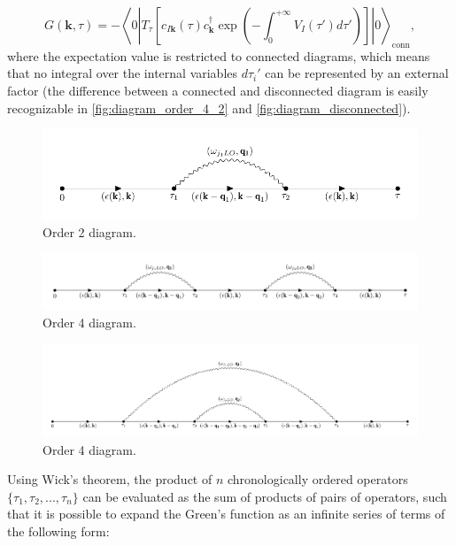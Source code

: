 \begin{equation}
    G(\mathbf{k},\tau)=-\left\langle 0 \left| T_\tau\left[c_{I\mathbf{k}}(\tau)c^\dagger_\mathbf{k}\exp{\left(-\int_0^{+\infty}V_I(\tau')d\tau'\right)}\right]\right|0\right\rangle_{\text{conn}},
\end{equation}
where the expectation value is restricted to connected diagrams, which means that no integral over the internal variables $d\tau_i'$ can be represented 
by an external factor (the difference between a connected and disconnected diagram is easily recognizable in \ref{fig:diagram_order_4_2} and 
\ref{fig:diagram_disconnected}).
\begin{figure}[H]
    \centering
    \includegraphics[scale=0.745]{diagram_order_2.pdf}
    \caption{Order 2 diagram.}
    \label{fig:diagram_order_2}
\end{figure}
\begin{figure}[H]
    \centering
    \includegraphics[scale=0.738]{diagram_order_4_1.pdf}
    \caption{Order 4 diagram.}
    \label{fig:diagram_order_4_1}
\end{figure}
\begin{figure}[H]
    \centering
    \includegraphics[scale=0.58]{diagram_order_4_3.pdf}
    \caption{Order 4 diagram.}
    \label{fig:diagram_order_4_3}
\end{figure}
Using Wick's theorem, the product of $n$ chronologically ordered operators $\{\tau_1,\tau_2,...,\tau_n\}$ can be evaluated as the sum 
of products of pairs of operators, such that it is possible to expand the Green's function as an infinite series of terms of the following form:

